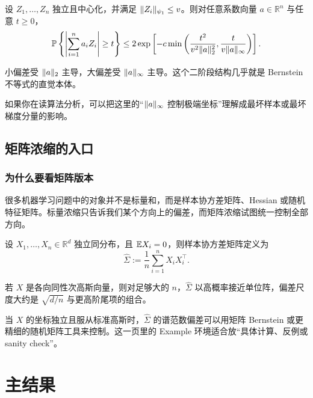 \documentclass[10pt,openany]{book}
\begin{document}
\begin{theorem}[Bernstein 型界]
设 $Z_1,\dots,Z_n$ 独立且中心化，并满足 $\norm{Z_i}_{\psi_1}\le v$。则对任意系数向量 $a\in\mathbb{R}^n$ 与任意 $t\ge 0$，
\[
\mathbb{P}\left\{ \abs*{\sum_{i=1}^n a_i Z_i} \ge t \right\}
\le 2\exp\left[
  -c \min\left(
    \frac{t^2}{v^2\norm{a}_2^2},
    \frac{t}{v\norm{a}_\infty}
  \right)
\right].
\]
\end{theorem}

\begin{Takeaway}
小偏差受 $\norm{a}_2$ 主导，大偏差受 $\norm{a}_\infty$ 主导。这个二阶段结构几乎就是 Bernstein 不等式的直觉本体。
\end{Takeaway}

\begin{remark}
如果你在读算法分析，可以把这里的“$\norm{a}_\infty$ 控制极端坐标”理解成最坏样本或最坏梯度分量的影响。
\end{remark}

\chapter{矩阵浓缩的入口}

\section{为什么要看矩阵版本}

很多机器学习问题中的对象并不是标量和，而是样本协方差矩阵、Hessian 或随机特征矩阵。标量浓缩只告诉我们某个方向上的偏差，而矩阵浓缩试图统一控制全部方向。

\begin{definition}[样本协方差]
设 $X_1,\dots,X_n\in\mathbb{R}^d$ 独立同分布，且 $\E X_i = 0$，则样本协方差矩阵定义为
\[
\widehat{\Sigma} := \frac{1}{n}\sum_{i=1}^n X_i X_i^\top.
\]
\end{definition}

\begin{proposition}[各向同性次高斯向量]
若 $X$ 是各向同性次高斯向量，则对足够大的 $n$，$\widehat{\Sigma}$ 以高概率接近单位阵，偏差尺度大约是 $\sqrt{d/n}$ 与更高阶尾项的组合。
\end{proposition}

\begin{Example}
当 $X$ 的坐标独立且服从标准高斯时，$\widehat{\Sigma}$ 的谱范数偏差可以用矩阵 Bernstein 或更精细的随机矩阵工具来控制。这一页里的 Example 环境适合放“具体计算、反例或 sanity check”。
\end{Example}

\part{主结果}
\end{document}

